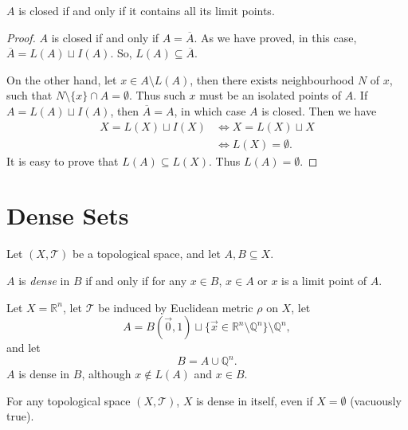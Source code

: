 \begin{proposition}
	$A$ is closed if and only if it contains all its limit points.
	
	\begin{proof}
		$A$ is closed if and only if $A = \overline A$. As we have proved, in this case, $\overline A = L(A) \sqcup I(A)$. So, $L(A) \subseteq \overline A$.
		
		On the other hand, let $x \in A \setminus L(A)$, then there exists neighbourhood $N$ of $x$, such that $N \setminus \{x\} \cap A = \emptyset$. Thus such $x$ must be an isolated points of $A$. If $A = L(A) \sqcup I(A)$, then $\overline A = A$, in which case $A$ is closed. Then we have
		$$
		\begin{aligned}
			X = L(X) \sqcup I(X) & \iff X = L(X) \sqcup X \\
			&\iff L(X) = \emptyset.
		\end{aligned}
		$$
		It is easy to prove that $L(A) \subseteq L(X)$. Thus $L(A) = \emptyset$.
	\end{proof}
\end{proposition}


\section{Dense Sets}


Let $(X, \mathcal T)$ be a topological space, and let $A, B \subseteq X$.


\begin{definition}
	$A$ is \textit{dense} in $B$ if and only if for any $x \in B$, $x \in A$ or $x$ is a limit point of $A$.
\end{definition}


\begin{example}
	Let $X = \mathbb R^n$, let $\mathcal T$ be induced by Euclidean metric $\rho$ on $X$, let
	$$
	A = B(\vec 0, 1) \sqcup \{\vec x \in \mathbb R^n \setminus \mathbb Q^n\} \setminus \mathbb Q^n,
	$$
	and let
	$$
	B = A \cup \mathbb Q^n.
	$$
	$A$ is dense in $B$, although $x \notin L(A)$ and $x \in B$.
\end{example}


\begin{example}
	For any topological space $(X, \mathcal T)$, $X$ is dense in itself, even if $X = \emptyset$ (vacuously true).
\end{example}


